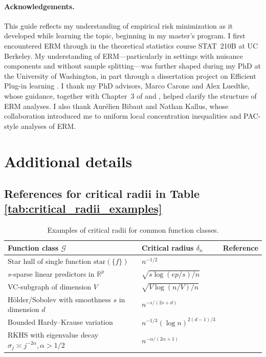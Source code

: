 \documentclass[11pt]{article}
\theoremstyle{plain}
\theoremstyle{definition} %
\begin{document}
\paragraph{Acknowledgements.}
This guide reflects my understanding of empirical risk minimization as it developed while learning the topic, beginning in my master's program. I first encountered ERM through \citet{wainwright2019high} in the theoretical statistics course STAT~210B at UC Berkeley. My understanding of ERM---particularly in settings with nuisance components and without sample splitting---was further shaped during my PhD at the University of Washington, in part through a dissertation project on Efficient Plug-in learning \citep{van2024combining}. I thank my PhD advisors, Marco Carone and Alex Luedtke, whose guidance, together with Chapter~3 of \citet{van1996weak} and \citet{van2011local}, helped clarify the structure of ERM analyses. I also thank Aur\'elien Bibaut and Nathan Kallus, whose collaboration introduced me to uniform local concentration inequalities and PAC-style analyses of ERM.  






\appendix

 

\section{Additional details}



\subsection{References for critical radii in Table \ref{tab:critical_radii_examples}}
\label{app:references}

 


\begin{table}[h]
\centering
\caption{Examples of critical radii for common function classes.}
\label{tab:critical_radii_examples2}
\begin{tabular}{|lll|}
\hline
Function class $\mathcal{G}$ & Critical radius $\delta_n$ & Reference \\
\hline
Star hull of single function $\mathrm{star}(\{f\})$
& $n^{-1/2}$
& \citet{wainwright2019high} \\
$s$-sparse linear predictors in $\mathbb{R}^p$
& $\sqrt{s\log(e p/s)/n}$
& \citet{wainwright2019high}
\\
VC-subgraph of dimension $V$
& $\sqrt{V\log(n/V)/n}$
& \citet{van1996weak}
\\
H\"older/Sobolev with smoothness $s$ in dimension $d$
& $n^{-s/(2s+d)}$
& \citet{nickl2007bracketing}
\\
Bounded Hardy--Krause variation
& $n^{-1/3}(\log n)^{2(d-1)/3}$
& \citet{bibaut2019fast}
\\
RKHS with eigenvalue decay $\sigma_j \asymp j^{-2\alpha}, \alpha > 1/2$
& $n^{-\alpha/(2\alpha+1)}$
& \citet{mendelson2010regularization}
\\
\hline
\end{tabular}
\end{table}
\end{document}

